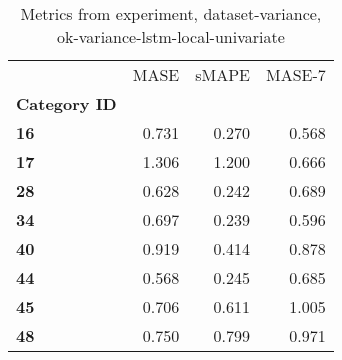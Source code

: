 \begin{table}[h]
\centering
\caption{Metrics from experiment, dataset-variance, ok-variance-lstm-local-univariate}
\label{table:ok-variance-lstm-local-univariate-dataset-variance}
\begin{tabular}{lrrr}
\toprule
{} &   MASE &  sMAPE &  MASE-7 \\
\textbf{Category ID} &        &        &         \\
\midrule
\textbf{16         } &  0.731 &  0.270 &   0.568 \\
\textbf{17         } &  1.306 &  1.200 &   0.666 \\
\textbf{28         } &  0.628 &  0.242 &   0.689 \\
\textbf{34         } &  0.697 &  0.239 &   0.596 \\
\textbf{40         } &  0.919 &  0.414 &   0.878 \\
\textbf{44         } &  0.568 &  0.245 &   0.685 \\
\textbf{45         } &  0.706 &  0.611 &   1.005 \\
\textbf{48         } &  0.750 &  0.799 &   0.971 \\
\bottomrule
\end{tabular}
\end{table}
